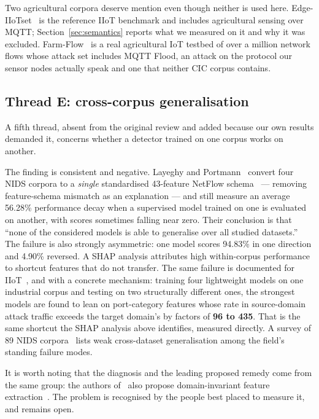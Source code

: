 \documentclass[conference]{IEEEtran}
\begin{document}
Two agricultural corpora deserve mention even though neither is used here.
Edge-IIoTset~\cite{ferrag2022edgeiiotset} is the reference IIoT benchmark and includes
agricultural sensing over MQTT; Section~\ref{sec:semantics} reports what we measured on it and why
it was excluded. Farm-Flow~\cite{ferreira2025farmflow} is a real agricultural IoT testbed of over a
million network flows whose attack set includes MQTT Flood, an attack on the protocol our sensor
nodes actually speak and one that neither CIC corpus contains.

\subsection{Thread E: cross-corpus generalisation}\label{sec:thread_e}
A fifth thread, absent from the original review and added because our own results demanded it,
concerns whether a detector trained on one corpus works on another.

The finding is consistent and negative. Layeghy and
Portmann~\cite{layeghy2022generalisability} convert four NIDS corpora to a \emph{single}
standardised 43-feature NetFlow schema~\cite{sarhan2021standardfeature} --- removing feature-schema
mismatch as an explanation --- and still measure an average 56.28\% performance decay when a
supervised model trained on one is evaluated on another, with scores sometimes falling near zero.
Their conclusion is that ``none of the considered models is able to generalise over all studied
datasets.'' The failure is also strongly asymmetric: one model scores 94.83\% in one direction and
4.90\% reversed. A SHAP analysis attributes high within-corpus performance to shortcut features
that do not transfer. The same failure is documented for IIoT~\cite{hakim2026crossdomain}, and with a
concrete mechanism: training four lightweight models on one industrial corpus and testing on two
structurally different ones, the strongest models are found to lean on port-category features
whose rate in source-domain attack traffic exceeds the target domain's by factors of
\textbf{96 to 435}. That is the same shortcut the SHAP analysis above identifies, measured
directly. A survey of 89 NIDS corpora~\cite{goldschmidt2025datasetsurvey} lists weak
cross-dataset generalisation among the field's standing failure modes.

It is worth noting that the diagnosis and the leading proposed remedy come from the same group:
the authors of~\cite{layeghy2022generalisability} also propose domain-invariant feature
extraction~\cite{layeghy2023dinids}. The problem is recognised by the people best placed to
measure it, and remains open.
\end{document}
